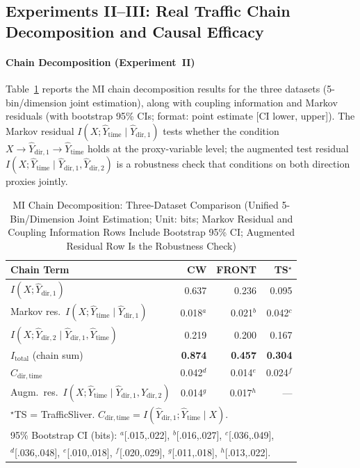 \documentclass[lettersize,journal]{IEEEtran}
\begin{document}
\subsection{Experiments II--III: Real Traffic Chain Decomposition and Causal Efficacy}

\paragraph{Chain Decomposition (Experiment~II)}
Table~\ref{tab:chain} reports the MI chain decomposition results for the
three datasets (5-bin/dimension joint estimation), along with coupling
information and Markov residuals (with bootstrap 95\% CIs; format:
point estimate [CI lower, upper]).
The Markov residual $I(X;\hat{Y}_{\mathrm{time}}\mid\hat{Y}_{\mathrm{dir},1})$
tests whether the condition
$X\to\hat{Y}_{\mathrm{dir},1}\to\hat{Y}_{\mathrm{time}}$ holds at the
proxy-variable level; the augmented test residual
$I(X;\hat{Y}_{\mathrm{time}}\mid \hat{Y}_{\mathrm{dir},1},\hat{Y}_{\mathrm{dir},2})$
is a robustness check that conditions on both direction proxies jointly.

\begin{table}[!t]
\centering\small
\caption{MI Chain Decomposition: Three-Dataset Comparison
(Unified 5-Bin/Dimension Joint Estimation; Unit: bits; Markov Residual
and Coupling Information Rows Include Bootstrap 95\% CI; Augmented
Residual Row Is the Robustness Check)}
\label{tab:chain}
\scriptsize
\begin{tabular}{lrrr}
\toprule
Chain Term & CW & FRONT & TS$^{\star}$ \\
\midrule
$I(X;\hat{Y}_{\mathrm{dir},1})$
  & 0.637 & 0.236 & 0.095 \\
Markov res.\ $I(X;\hat{Y}_{\mathrm{time}}\!\mid\!\hat{Y}_{\mathrm{dir},1})$
  & 0.018$^{a}$ & 0.021$^{b}$ & 0.042$^{c}$ \\
$I(X;\hat{Y}_{\mathrm{dir},2}\!\mid\!\hat{Y}_{\mathrm{dir},1},\hat{Y}_{\mathrm{time}})$
  & 0.219 & 0.200 & 0.167 \\
$I_{\mathrm{total}}$ (chain sum)
  & \textbf{0.874} & \textbf{0.457} & \textbf{0.304} \\
\midrule
$C_{\mathrm{dir,time}}$
  & 0.042$^{d}$ & 0.014$^{e}$ & 0.024$^{f}$ \\
Augm.\ res.\ $I(X;\hat{Y}_{\mathrm{time}}\!\mid\!\hat{Y}_{\mathrm{dir},1},\hat{Y}_{\mathrm{dir},2})$
  & 0.014$^{g}$ & 0.017$^{h}$ & --- \\
\bottomrule
\multicolumn{4}{l}{$^{\star}$TS = TrafficSliver.
  $C_{\mathrm{dir,time}}=I(\hat{Y}_{\mathrm{dir},1};\hat{Y}_{\mathrm{time}}\!\mid\! X)$.}\\
\multicolumn{4}{l}{95\% Bootstrap CI (bits):
  $^{a}$[.015,.022], $^{b}$[.016,.027], $^{c}$[.036,.049],}\\
\multicolumn{4}{l}{$^{d}$[.036,.048], $^{e}$[.010,.018], $^{f}$[.020,.029],
  $^{g}$[.011,.018], $^{h}$[.013,.022].}
\end{tabular}
\end{table}
\end{document}
